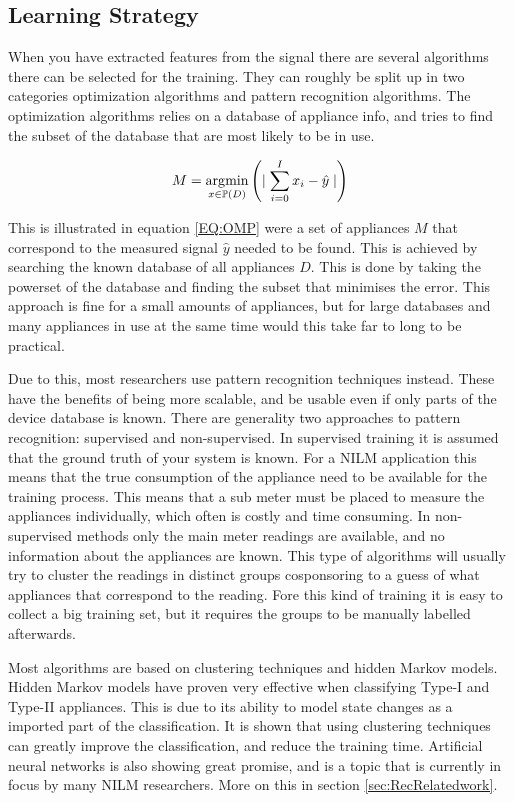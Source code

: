 \subsection{Learning Strategy} 
When you have extracted features from the signal there are several algorithms there can be selected for the training. They can roughly be split up in two categories optimization algorithms and pattern recognition algorithms. The optimization algorithms relies on a database of appliance info, and tries to find the subset of the database that are most likely to be in use. 

\begin{equation}
	M = \operatorname*{\arg\!\min}_{x \in \mathbb{P}(D) } \left( \mid {\sum_{i = 0}^{I} x_i - \hat{y}  \mid} \right)
	\label{EQ:OMP}
\end{equation}

This is illustrated in equation \ref{EQ:OMP} were a set of appliances $M$ that correspond to the measured signal $\hat{y}$ needed to be found. This is achieved by searching the known database of all appliances $D$. This is done by taking the powerset of the database and finding the subset that minimises the error. This approach is fine for a small amounts of appliances, but for large databases and many appliances in use at the same time would this take far to long to be practical. 

Due to this, most researchers use pattern recognition techniques instead. These have the benefits of being more scalable, and be usable even if only parts of the device database is known. There are generality two approaches to pattern recognition: supervised and non-supervised. In supervised training it is assumed that the ground truth of your system is known. For a NILM application this means that the true consumption of the appliance need to be available for the training process. This means that a sub meter must be placed to measure the appliances individually, which often is costly and time consuming. In non-supervised methods only the main meter readings are available, and no information about the appliances are known. This type of algorithms will usually try to cluster the readings in distinct groups cosponsoring to a guess of what appliances that correspond to the reading. Fore this kind of training it is easy to collect a big training set, but it requires the groups to be manually labelled afterwards.  
  
Most algorithms are based on clustering techniques and hidden Markov models. Hidden Markov models have proven very effective when classifying Type-I and Type-II appliances. This is due to its ability to model state changes as a imported part of the classification. It is shown that using clustering techniques can greatly improve the classification, and reduce the training time. Artificial neural networks is also showing great promise, and is a topic that is currently in focus by many NILM researchers. More on this in section \ref{sec:RecRelatedwork}. 

